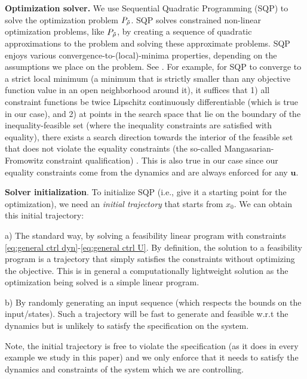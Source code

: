 \textbf{Optimization solver.}
We use Sequential Quadratic Programming (SQP) to solve the optimization problem $P_{\tilde{\rho}}$.
SQP solves constrained non-linear optimization problems, like $P_{\tilde{\rho}}$, by creating a sequence of quadratic approximations to the problem and solving these approximate problems.
SQP enjoys various convergence-to-(local)-minima properties, depending on the assumptions we place on the problem. 
See \cite[Section 2.9]{Polak97_Optim}.
For example, for SQP to converge to a strict local minimum (a minimum that is strictly smaller than any objective function value in an open neighborhood around it), it suffices that 
1) all constraint functions be twice Lipschitz continuously differentiable (which is true in our case), and 
2) at points in the search space that lie on the boundary of the inequality-feasible set (where the inequality constraints are satisfied with equality), there exists a search direction towards the interior of the feasible set that does not violate the equality constraints (the so-called Mangasarian-Fromowitz constraint qualification) \cite[Assumption 2.9.1]{Polak97_Optim}.
This is also true in our case since our equality constraints come from the dynamics and are always enforced for any $\mathbf{u}$.

\textbf{Solver initialization}.
To initialize SQP (i.e., give it a starting point for the optimization), we need an \textit{initial trajectory} that starts from $x_0$. We can obtain this initial trajectory:

 a) The standard way, by solving a feasibility linear program with constraints \eqref{eq:general ctrl dyn}-\eqref{eq:general ctrl U}. By definition, the solution to a feasibility program is a trajectory that simply satisfies the constraints without optimizing the objective. This is in general a computationally lightweight solution as the optimization being solved is a simple linear program.
 
 b) By randomly generating an input sequence (which respects the bounds on the input/states). Such a trajectory will be fast to generate and feasible w.r.t the dynamics but is unlikely to satisfy the specification on the system. 

Note, the initial trajectory is free to violate the specification (as it does in every example we study in this paper) and we only enforce that it needs to satisfy the dynamics and constraints of the system which we are controlling.


